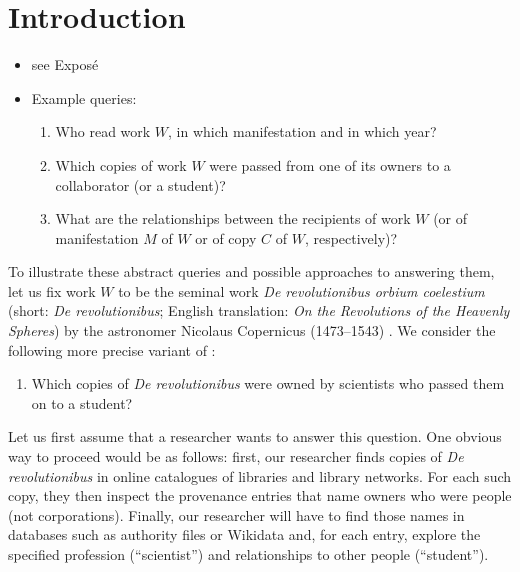 \chapter{Introduction}
\label{chap:intro}

\begin{itemize}
  \item
    see Exposé
  \item
    Example queries:
    \begin{enumerate}
      \item[\exaquery{1}]
        Who read work $W$, in which manifestation and in which year?
      \item[\exaquery{2}]
        Which copies of work $W$ were passed from one of its owners to a collaborator (or a student)?
      \item[\exaquery{3}]
        What are the relationships between the recipients of work $W$
        (or of manifestation $M$ of $W$ or of copy $C$ of $W$, respectively)?
    \end{enumerate}
\end{itemize}
%
To illustrate these abstract queries and possible approaches to answering them, let us fix work $W$ to be the seminal work \emph{De revolutionibus orbium coelestium}
(short: \emph{De revolutionibus}; English translation: \emph{On the Revolutions of the Heavenly Spheres}) by the astronomer Nicolaus Copernicus (1473–1543) .
We consider the following more precise variant of :
%
\begin{enumerate}
  \item[\exaquery{2$'$}]
    Which copies of \emph{De revolutionibus} were owned by scientists who passed them on to a student?
\end{enumerate}
%
Let us first assume that a researcher wants to answer this question.
One obvious way to proceed would be as follows: first, our researcher finds copies of \emph{De revolutionibus} 
in online catalogues of libraries and library networks. For each such copy, they then inspect the provenance entries
that name owners who were people (not corporations). Finally, our researcher will have to find those names in databases such as
authority files or Wikidata and, for each entry, explore the specified profession (``scientist'') and relationships to other people (``student'').

